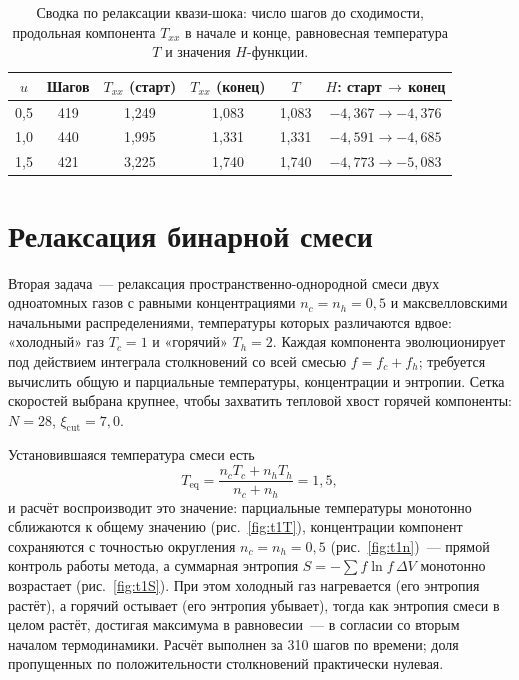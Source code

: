 \begin{table}[h]
  \centering
\caption{Сводка по релаксации квази-шока: число шагов до сходимости, продольная компонента $T_{xx}$ в начале и конце,
равновесная температура $T$ и значения $H$-функции.}
  \label{tab:t0}
  \begin{tabular}{cccccc}
    \hline
    $u$ & Шагов & $T_{xx}$ (старт) & $T_{xx}$ (конец) & $T$ & $H$: старт\,$\to$\,конец\\
    \hline
    0,5 & 419 & 1,249 & 1,083 & 1,083 & $-4{,}367\to-4{,}376$\\
    1,0 & 440 & 1,995 & 1,331 & 1,331 & $-4{,}591\to-4{,}685$\\
    1,5 & 421 & 3,225 & 1,740 & 1,740 & $-4{,}773\to-5{,}083$\\
    \hline
  \end{tabular}
\end{table}

\section{Релаксация бинарной смеси}

Вторая задача~--- релаксация пространственно-однородной смеси двух одноатомных газов с равными концентрациями
$n_c=n_h=0{,}5$ и максвелловскими начальными распределениями, температуры которых различаются вдвое: «холодный» газ
$T_c=1$ и «горячий» $T_h=2$.
Каждая компонента эволюционирует под действием интеграла столкновений со всей смесью $f=f_c+f_h$; требуется вычислить
общую и парциальные температуры, концентрации и энтропии.
Сетка скоростей выбрана крупнее, чтобы захватить тепловой хвост горячей компоненты: $N=28$, $\xi_{\mathrm{cut}}=7{,}0$.

Установившаяся температура смеси есть
\begin{equation}
  T_{\mathrm{eq}}=\frac{n_c T_c+n_h T_h}{n_c+n_h}=1{,}5,
\end{equation}
и расчёт воспроизводит это значение: парциальные температуры монотонно сближаются к общему значению
(рис.~\ref{fig:t1T}), концентрации компонент сохраняются с точностью округления $n_c=n_h=0{,}5$ (рис.~\ref{fig:t1n})~---
прямой контроль работы метода, а суммарная энтропия $S=-\sum f\ln f\,\Delta V$ монотонно возрастает
(рис.~\ref{fig:t1S}).
При этом холодный газ нагревается (его энтропия растёт), а горячий остывает (его энтропия убывает), тогда как энтропия
смеси в целом растёт, достигая максимума в равновесии~--- в согласии со вторым началом термодинамики.
Расчёт выполнен за 310 шагов по времени; доля пропущенных по положительности столкновений практически нулевая.

